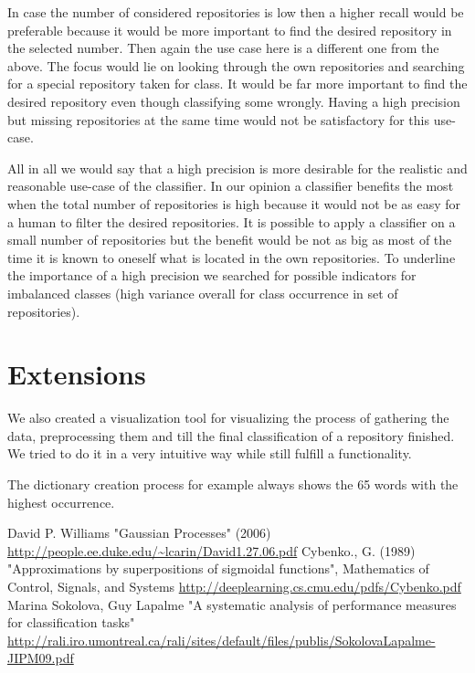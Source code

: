 \documentclass[paper=A4,pagesize=auto,12pt,headinclude=true,footinclude=true,BCOR=0mm,DIV=calc]{scrartcl}
\begin{document}
	
	In case the number of considered repositories is low then a higher recall would be preferable because it would be more important to find the desired repository in the selected number. Then again the use case here is a different one from the above. The focus would lie on looking through the own repositories and searching for a special repository taken for class. It would be far more important to find the desired repository even though classifying some wrongly. Having a high precision but missing repositories at the same time would not be satisfactory for this use-case.
	
	
	All in all we would say that a high precision is more desirable for the realistic and reasonable use-case of the classifier. In our opinion a classifier benefits the most when the total number of repositories is high because it would not be as easy for a human to filter the desired repositories. It is possible to apply a classifier on a small number of repositories but the benefit would be not as big as most of the time it is known to oneself what is located in the own repositories.
	To underline the importance of a high precision we searched for possible indicators for imbalanced classes (high variance overall for class occurrence in set of repositories).
	
	
	\section{Extensions}
		We also created a visualization tool for visualizing the process of gathering the data, preprocessing them and till the final classification of a repository finished. We tried to do it in a very intuitive way while still fulfill a functionality.
		
		The dictionary creation process for example always shows the 65 words with the highest occurrence.
	
	\newpage
	
	\begin{thebibliography}{xxxxxx}
		 David P. Williams "Gaussian Processes" (2006) \url{http://people.ee.duke.edu/~lcarin/David1.27.06.pdf}
		  Cybenko., G. (1989) "Approximations by superpositions of sigmoidal functions", Mathematics of Control, Signals, and Systems \url{http://deeplearning.cs.cmu.edu/pdfs/Cybenko.pdf}
		 Marina Sokolova, Guy Lapalme "A systematic analysis of performance measures for classification tasks" \url{http://rali.iro.umontreal.ca/rali/sites/default/files/publis/SokolovaLapalme-JIPM09.pdf}
	
	\end{thebibliography}
	
\end{document}
